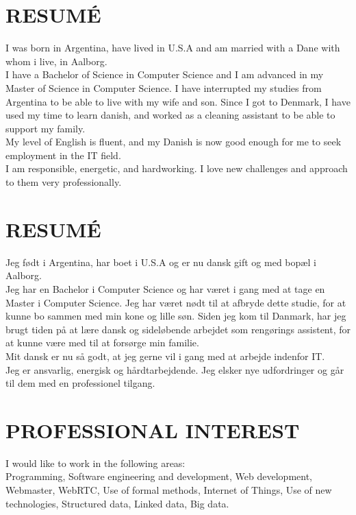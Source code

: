 \documentclass[11pt,a4paper,sans]{moderncv}        %
\makeatletter
\let\oldmakecvtitle\makecvtitle
\renewcommand*{\makecvtitle}{%
  {\centering\framebox{\texttt{[image: \\@photo]}}\par\vspace{10pt}}%
  \oldmakecvtitle%
}%
\makeatother
\begin{document}
\makecvtitle

\ifenglish
\section{RESUMÉ}
I was born in Argentina, have lived in U.S.A and am married with a Dane with whom i live, in Aalborg.\\
I have a Bachelor of Science in Computer Science and I am advanced in my Master of Science in Computer Science. I have interrupted my studies from Argentina to be able to live with my wife and son. Since I got to Denmark, I have used my time to learn danish, and worked as a cleaning assistant to be able to support my family.\\
My level of English is fluent, and my Danish is now good enough for me to seek employment in the IT field.\\
I am responsible, energetic, and hardworking. I love new challenges and approach to them very professionally.
\else
\section{RESUMÉ}
Jeg født i Argentina, har boet i U.S.A og er nu dansk gift og med bopæl i Aalborg.\\
Jeg har en Bachelor i Computer Science og har været i gang med at tage en Master i Computer Science. Jeg har været nødt til at afbryde dette studie, for at kunne bo sammen med min kone og lille søn. Siden jeg kom til Danmark, har jeg brugt tiden på at lære dansk og sideløbende arbejdet som rengørings assistent, for at kunne være med til at forsørge min familie.\\
Mit dansk er nu så godt, at jeg gerne vil i gang med at arbejde indenfor IT.\\
Jeg er ansvarlig, energisk og hårdtarbejdende. Jeg elsker nye udfordringer og går til dem med en professionel tilgang.
\fi

\ifenglish
\section{PROFESSIONAL INTEREST}
I would like to work in the following areas:\\
Programming, Software engineering and development, Web development, Webmaster, WebRTC, Use of formal methods, Internet of Things, Use of new technologies, Structured data, Linked data, Big data.
\else
\end{document}
